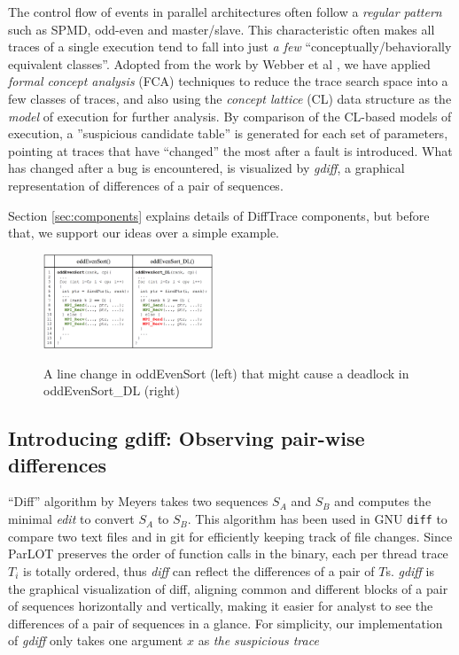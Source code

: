 %
The control flow of events in parallel architectures often follow a \textit{regular pattern} such as SPMD, odd-even and master/slave. This characteristic often makes all traces of a single execution tend to fall into just \textit{a few} ``conceptually/behaviorally equivalent classes''.
%
Adopted from the work by Webber et al \cite{weberStructural}, we have applied \textit{formal concept analysis} (FCA)\cite{clbook} techniques to reduce the trace search space into a few classes of traces, and also using the \textit{concept lattice} (CL) data structure as the \textit{model} of execution for further analysis.
%
By comparison of the CL-based models of execution, a ''suspicious candidate table'' is generated for each set of parameters, pointing at traces that have ``changed'' the most after a fault is introduced. 
%
What has changed after a bug is encountered, is visualized by \textit{gdiff}, a graphical representation of differences of a pair of sequences.



Section \ref{sec:components} explains details of DiffTrace components, but before that, we support our ideas over a simple example. 


\begin{figure}[]
\centering
\caption{A line change in oddEvenSort (left) that might cause a deadlock in oddEvenSort\_DL (right)}
\includegraphics[width=0.45\textwidth]{figs/oddEvenDL.png}
\label{fig.oddEvenDL}
\end{figure}

\subsection{Introducing \textbf{gdiff}: Observing pair-wise differences}
``Diff'' algorithm by Meyers \cite{diff-myers} takes two sequences $S_A$ and $S_B$ and computes the minimal \textit{edit} to convert $S_A$ to $S_B$. This algorithm has been used in GNU \texttt{diff} to compare two text files and in git for efficiently keeping track of file changes.
Since ParLOT preserves the order of function calls in the binary, each per thread trace $T_i$ is totally ordered, thus \textit{diff} can reflect the differences of a pair of $T$s. \textit{gdiff} is the graphical visualization of diff, aligning common and different blocks of a pair of sequences horizontally and vertically, making it easier for analyst to see the differences of a pair of sequences in a glance.  
For simplicity, our implementation of \textit{gdiff} only takes one argument $x$ as \textit{the suspicious trace}


